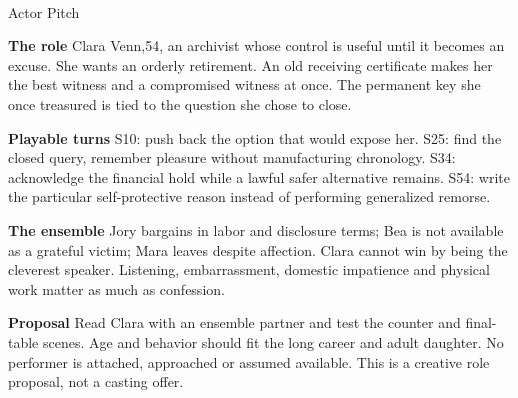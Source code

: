 \documentclass[11pt,letterpaper]{article}
\begin{document}
\begin{center}
{\Large\bfseries\sffamily \filmtitleupper}\\[6pt]
Actor Pitch
\end{center}
\textbf{The role} Clara Venn,54, an archivist whose control is useful until it becomes an excuse. She wants an orderly retirement. An old receiving certificate makes her the best witness and a compromised witness at once. The permanent key she once treasured is tied to the question she chose to close.

\textbf{Playable turns} S10: push back the option that would expose her. S25: find the closed query, remember pleasure without manufacturing chronology. S34: acknowledge the financial hold while a lawful safer alternative remains. S54: write the particular self-protective reason instead of performing generalized remorse.

\textbf{The ensemble} Jory bargains in labor and disclosure terms; Bea is not available as a grateful victim; Mara leaves despite affection. Clara cannot win by being the cleverest speaker. Listening, embarrassment, domestic impatience and physical work matter as much as confession.

\textbf{Proposal} Read Clara with an ensemble partner and test the counter and final-table scenes. Age and behavior should fit the long career and adult daughter. No performer is attached, approached or assumed available. This is a creative role proposal, not a casting offer.
\end{document}

